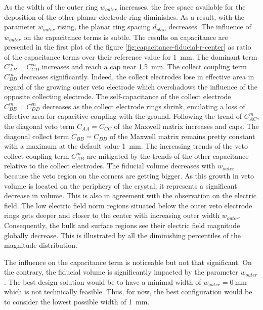 As the width of the outer ring $w_{outer}$ increases, the free space available for the deposition of the other planar electrode ring diminishes. As a result, with the parameter $w_{outer}$ rising, the planar ring spacing $d_{plan}$ decreases.
The influence of $w_{outer}$ on the capacitance terms is subtle. The results on capacitance are presented in the first plot of the figure \ref{fig:capacitance-fiducial-r-center} as ratio of the capacitance terms over their reference value for \SI{1}{\mm}. The dominant term $C_{AB}^m=C_{CD}^m$ increases and reach a cap near \SI{1.5}{\mm}. The collect coupling term $C_{BD}^m$ decreases significantly.  Indeed, the collect electrodes lose in effective area in regard of the growing outer veto electrode which overshadows the influence of the opposite collecting electrode. The self-capacitance of the collect electrode $C_{BB}^m=C_{DD}^m$ decreases as the collect electrode rings shrink, emulating a loss of effective area for capacitive coupling with the ground. Following the trend of $C_{AC}^m$, the diagonal veto term $C_{AA} = C_{CC}$ of the Maxwell matrix increases and caps. The diagonal collect term $C_{BB} = C_{DD}$ of the Maxwell matrix remains pretty constant with a maximum at the default value \SI{1}{\mm}. The increasing trends of the veto collect coupling term $C_{AB}^m$ are mitigated by the trends of the other capacitance relative to the collect electrodes.
The fiducial volume decreases with $w_{outer}$ because the veto region on the corners are getting bigger. As this growth in veto volume is located on the periphery of the crystal, it represents a significant decrease in volume.
This is also in agreement with the observation on the electric field. The low electric field norm regions situated below the outer veto electrode rings gets deeper and closer to the center with increasing outer width $w_{outer}$. Consequently, the bulk and surface regions see their electric field magnitude globally decrease. This is illustrated by all the diminishing percentiles of the magnitude distribution. 

The influence on the capacitance term is noticeable but not that significant. On the contrary, the fiducial volume is significantly impacted by the parameter $w_{outer}$. The best design solution would be to have a minimal width of $w_{outer}=\SI{0}{\mm}$ which is not technically feasible. Thus, for now, the best configuration would be to consider the lowest possible width of \SI{1}{\mm}.


